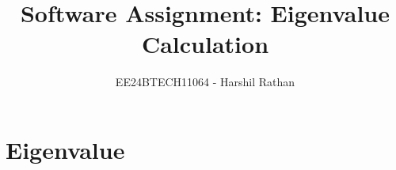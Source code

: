\documentclass[journal]{IEEEtran}
\begin{document}

\vspace{3cm}

\title{Software Assignment: Eigenvalue Calculation}
\author{EE24BTECH11064 - Harshil Rathan}
 \maketitle
\tableofcontents
\newpage
{\let\newpage\relax\maketitle}

\renewcommand{\thefigure}{\theenumi}
\renewcommand{\thetable}{\theenumi}
\setlength{\intextsep}{10pt} %


\renewcommand{\thetable}{\theenumi}
\section{\textbf{Eigenvalue}}
\end{document}
